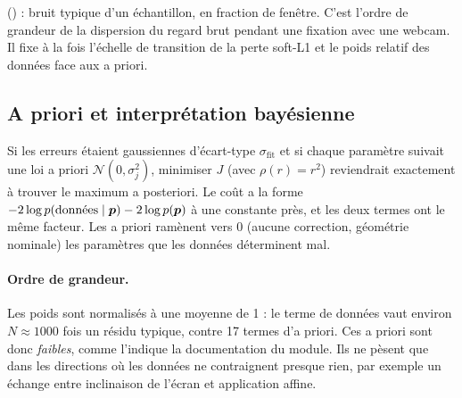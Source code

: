 \begin{origine}
 (\empi) : bruit typique d'un échantillon, en fraction de fenêtre. C'est l'ordre de grandeur de la dispersion du regard brut pendant une fixation avec une webcam. Il fixe à la fois l'échelle de transition de la perte soft-L1 et le poids relatif des données face aux a priori.
\end{origine}

\subsection{A priori et interprétation bayésienne}

Si les erreurs étaient gaussiennes d'écart-type $\sigma_\text{fit}$ et si chaque paramètre suivait une loi a priori $\mathcal N(0, \sigma_j^2)$, minimiser $J$ (avec $\rho(r) = r^2$) reviendrait exactement à trouver le maximum a posteriori. Le coût a la forme $-2\log p(\text{données}\mid\bm{p}) - 2\log p(\bm{p})$ à une constante près, et les deux termes ont le même facteur. Les a priori ramènent vers 0 (aucune correction, géométrie nominale) les paramètres que les données déterminent mal.

\paragraph{Ordre de grandeur.} Les poids sont normalisés à une moyenne de 1 : le terme de données vaut environ $N \approx \num{1000}$ fois un résidu typique, contre 17 termes d'a priori. Ces a priori sont donc \emph{faibles}, comme l'indique la documentation du module. Ils ne pèsent que dans les directions où les données ne contraignent presque rien, par exemple un échange entre inclinaison de l'écran et application affine.

